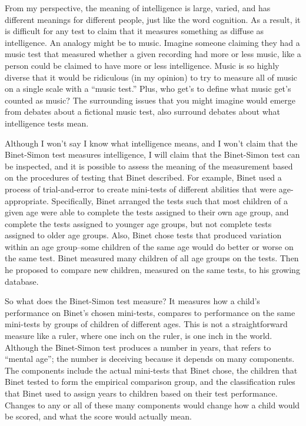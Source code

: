 \documentclass[
  oneside,
  12pt]{crumpbook}
\begin{document}
From my perspective, the meaning of intelligence is large, varied, and has different meanings for different people, just like the word cognition. As a result, it is difficult for any test to claim that it measures something as diffuse as intelligence. An analogy might be to music. Imagine someone claiming they had a music test that measured whether a given recording had more or less music, like a person could be claimed to have more or less intelligence. Music is so highly diverse that it would be ridiculous (in my opinion) to try to measure all of music on a single scale with a ``music test.'' Plus, who get's to define what music get's counted as music? The surrounding issues that you might imagine would emerge from debates about a fictional music test, also surround debates about what intelligence tests mean.

Although I won't say I know what intelligence means, and I won't claim that the Binet-Simon test measures intelligence, I will claim that the Binet-Simon test can be inspected, and it is possible to assess the meaning of the measurement based on the procedures of testing that Binet described. For example, Binet used a process of trial-and-error to create mini-tests of different abilities that were age-appropriate. Specifically, Binet arranged the tests such that most children of a given age were able to complete the tests assigned to their own age group, and complete the tests assigned to younger age groups, but not complete tests assigned to older age groups. Also, Binet chose tests that produced variation within an age group--some children of the same age would do better or worse on the same test. Binet measured many children of all age groups on the tests. Then he proposed to compare new children, measured on the same tests, to his growing database.

So what does the Binet-Simon test measure? It measures how a child's performance on Binet's chosen mini-tests, compares to performance on the same mini-tests by groups of children of different ages. This is not a straightforward measure like a ruler, where one inch on the ruler, is one inch in the world. Although the Binet-Simon test produces a number in years, that refers to ``mental age''; the number is deceiving because it depends on many components. The components include the actual mini-tests that Binet chose, the children that Binet tested to form the empirical comparison group, and the classification rules that Binet used to assign years to children based on their test performance. Changes to any or all of these many components would change how a child would be scored, and what the score would actually mean.
\end{document}
